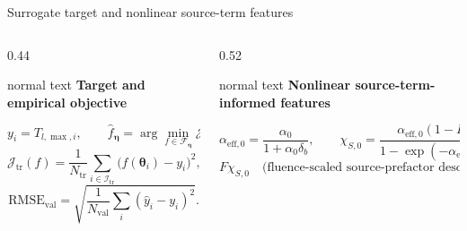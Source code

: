 \documentclass[aspectratio=169,10pt]{beamer}
\begin{document}
\begin{frame}[t]{Surrogate target and nonlinear source-term features}
  \vspace{0.02cm}
  \begin{columns}[T,totalwidth=0.96\textwidth]
    \begin{column}{0.44\textwidth}
      \begin{beamercolorbox}[wd=\linewidth,sep=0.46em]{normal text}
        \scriptsize
        \textbf{\color{GVTeal}Target and empirical objective}\par
        \vspace{-0.05cm}
        \[
          y_i=T_{l,\max,i},
          \qquad
          \widehat f_{\boldsymbol\eta}
          =\arg\min_{f\in\mathcal F_{\boldsymbol\eta}}\mathcal J_{\mathrm{tr}}(f),
        \]
        \vspace{-0.27cm}
        \[
          \mathcal J_{\mathrm{tr}}(f)
          =\frac{1}{N_{\mathrm{tr}}}
          \sum_{i\in\mathcal I_{\mathrm{tr}}}
          \bigl(f(\boldsymbol\theta_i)-y_i\bigr)^2,
        \]
        \vspace{-0.27cm}
        \[
          \mathrm{RMSE}_{\mathrm{val}}
          =\sqrt{\frac{1}{N_{\mathrm{val}}}
          \sum_i(\widehat y_i-y_i)^2}.
        \]
      \end{beamercolorbox}
    \end{column}
    \begin{column}{0.52\textwidth}
      \begin{beamercolorbox}[wd=\linewidth,sep=0.46em]{normal text}
        \scriptsize
        \textbf{\color{GVSourceBlue}Nonlinear source-term-informed features}\par
        \vspace{-0.05cm}
        \[
          \alpha_{\mathrm{eff},0}
          =
          \frac{\alpha_0}{1+\alpha_0\delta_b},
          \qquad
          \chi_{S,0}
          =
          \frac{\alpha_{\mathrm{eff},0}(1-R_0)}
          {1-\exp(-\alpha_{\mathrm{eff},0}L_z)},
        \]
        \vspace{-0.27cm}
        \[
          F\chi_{S,0}
          \quad\text{(fluence-scaled source-prefactor descriptor).}
        \]
      \end{beamercolorbox}
    \end{column}
  \end{columns}


\end{frame}
\end{document}
